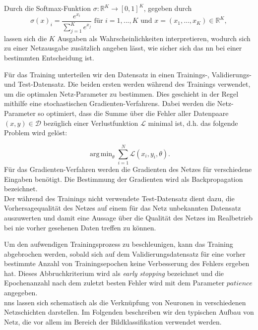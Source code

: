 \documentclass[twoside, 12pt,a4paper]{book}
\DeclareMathOperator*{\argmin}{arg\,min}
\numberwithin{equation}{section}
\begin{document}
	\noindent Durch die Softmax-Funktion $\sigma :\mathbb{R}^K \to [0,1]^K$, gegeben durch
	\begin{equation}
		\sigma(x)_i = \frac{e^{x_i}}{\sum_{j=1}^K{e^{x_j}}} \text{ für }i=1,...,K \text{ und } x = (x_1, ... , x_K) \in \mathbb{R}^K,
	\end{equation}lassen sich die $K$ Ausgaben als Wahrscheinlichkeiten interpretieren, wodurch sich zu einer Netzausgabe zusätzlich angeben lässt, wie sicher sich das \ac{nn} bei einer bestimmten Entscheidung ist. 
	
	\noindent Für das Training unterteilen wir den Datensatz in einen Trainings-, Va\-li\-die\-rungs- und Test-Datensatz. Die beiden ersten werden während des Trainings verwendet, um die optimalen Netz-Parameter zu bestimmen. Dies geschieht in der Regel mithilfe eine stochastischen Gradienten-Verfahrens. Dabei werden die Netz-Parameter so optimiert, dass die Summe über die Fehler aller Datenpaare $(x,y) \in \mathcal{D}$ bezüglich einer Verlustfunktion $\mathcal{L}$ minimal ist, d.h. das folgende Problem wird gelöst:
	
	\begin{equation}
		\argmin_\theta{\sum_{i=1}^N{\mathcal{L}(x_i,y_i,\theta)}}.
	\end{equation}
	Für das Gradienten-Verfahren werden die Gradienten des Netzes für verschiedene Eingaben benötigt. Die Bestimmung der Gradienten wird als Backpropagation bezeichnet.\\
	
	\noindent Der während des Trainings nicht verwendete Test-Datensatz dient dazu, die Vorhersagequalität des Netzes auf einem für das Netz unbekannten Datensatz auszuwerten und damit eine Aussage über die Qualität des Netzes im Realbetrieb bei nie vorher gesehenen Daten treffen zu können. 
	
	\noindent Um den aufwendigen Trainingsprozess zu beschleunigen, kann das Training abgebrochen werden, sobald sich auf dem Validierungsdatensatz für eine vorher bestimmte Anzahl von Trainingsepochen keine Verbesserung des Fehlers ergeben hat. Dieses Abbruchkriterium wird als \textit{early stopping} bezeichnet und die Epochenanzahl nach dem zuletzt besten Fehler wird mit dem Parameter $patience$ angegeben.\\
	

	\noindent \acp{nn} lassen sich schematisch als die Verknüpfung von Neuronen in verschiedenen Netzschichten darstellen. Im Folgenden beschreiben wir den typischen Aufbau von Netz, die vor allem im Bereich der Bildklassifikation verwendet werden.\\
	
\end{document}
